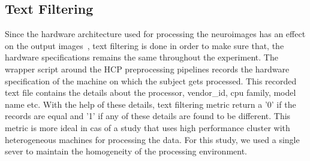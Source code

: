\subsection{Text Filtering}
Since the hardware architecture used for processing the neuroimages has an effect on the output images~\cite{10.1371/journal.pone.0038234}, text filtering is done in order to make sure that, the hardware specifications remains the same throughout the experiment. The wrapper script around the HCP preprocessing pipelines records the hardware specification of the machine on which the subject gets processed. This recorded text file contains the details about the processor, vendor\_id, cpu family, model name etc. With the help of these details, text filtering metric return a '0' if the records are equal and '1' if any of these details are found to be different. This metric is more ideal in cas of a study that uses high performance cluster with heterogeneous machines for processing the data. For this study, we used a single sever to maintain the homogeneity of the processing environment.
